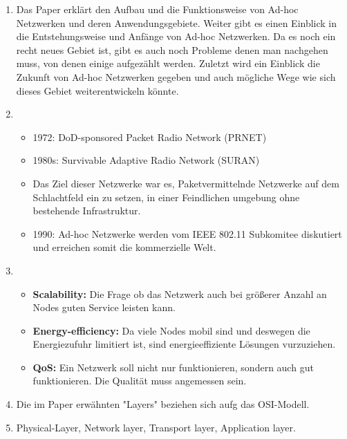     \begin{enumerate}[label=\arabic*)]
        \item Das Paper erklärt den Aufbau und die Funktionsweise von Ad-hoc Netzwerken und deren Anwendungsgebiete. Weiter gibt es einen Einblick in die Entstehungsweise und Anfänge von Ad-hoc Netzwerken. Da es noch ein recht neues Gebiet ist, gibt es auch noch Probleme denen man nachgehen muss, von denen einige aufgezählt werden. Zuletzt wird ein Einblick die Zukunft von Ad-hoc Netzwerken gegeben und auch mögliche Wege wie sich dieses Gebiet weiterentwickeln könnte.
        
        \item \begin{itemize}
            \item 1972: DoD-sponsored Packet Radio Network (PRNET)
            \item 1980s: Survivable Adaptive Radio Network (SURAN)
            \item Das Ziel dieser Netzwerke war es, Paketvermittelnde Netzwerke auf dem Schlachtfeld ein zu setzen, in einer Feindlichen umgebung ohne bestehende Infrastruktur.
            \item 1990: Ad-hoc Netzwerke werden vom IEEE 802.11 Subkomitee diskutiert und erreichen somit die kommerzielle Welt. 
        \end{itemize}
        \pagebreak
        \item \begin{itemize}
            \item \textbf{Scalability:} Die Frage ob das Netzwerk auch bei größerer Anzahl an Nodes guten Service leisten kann.
            
            \item \textbf{Energy-efficiency:} Da viele Nodes mobil sind und deswegen die Energiezufuhr limitiert ist, sind energieeffiziente Lösungen vurzuziehen.
            
            \item \textbf{QoS:} Ein Netzwerk soll nicht nur funktionieren, sondern auch gut funktionieren. Die Qualität muss angemessen sein.
        \end{itemize}
        
        \item Die im Paper erwähnten "Layers" beziehen sich aufg das OSI-Modell.
        
        \item Physical-Layer, Network layer, Transport layer, Application layer.
    \end{enumerate}



